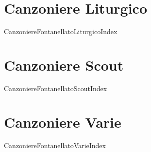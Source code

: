 \documentclass[a4paper,11pt,titlepage,openright,twoside]{book}
\renewcommand{\songchapter}{\chapter}
\begin{document}
	

\singlespacing
	

\pagestyle{fancy}
	\fancyhf{}
	\fancyhead[RO,LE]{\thepage}
	\renewcommand{\headrulewidth}{0pt}
	\renewcommand{\footrulewidth}{0pt}

\songchapter{Canzoniere Liturgico}
\begin{songs}{CanzoniereFontanellatoLiturgicoIndex}	

\end{songs}

\songchapter{Canzoniere Scout}
\begin{songs}{CanzoniereFontanellatoScoutIndex}

\end{songs}

\songchapter{Canzoniere Varie}
\begin{songs}{CanzoniereFontanellatoVarieIndex}

\end{songs}

\end{document}

